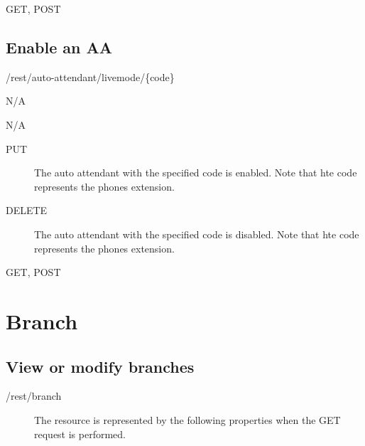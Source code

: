 \documentclass[letterpaper,10pt,english]{sphinxmanual}
\begin{document}
 GET, POST


\subsection{Enable an AA}
\label{\detokenize{restapi:enable-an-aa}}
 /rest/auto-attendant/livemode/\{code\}

 N/A

 N/A
\begin{description}
\item[{ PUT}] \leavevmode
The auto attendant with the specified code is enabled. Note that hte code represents the phones extension.

\item[{ DELETE}] \leavevmode
The auto attendant with the specified code is disabled. Note that hte code represents the phones extension.

\end{description}

 GET, POST


\section{Branch}
\label{\detokenize{restapi:branch}}

\subsection{View or modify branches}
\label{\detokenize{restapi:view-or-modify-branches}}
 /rest/branch
\begin{description}
\item[{}] \leavevmode
The resource is represented by the following properties when the GET request is performed.

\end{description}
\end{document}
